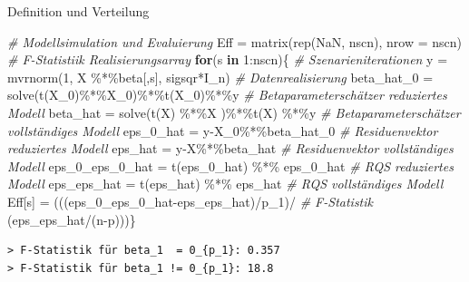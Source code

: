 \documentclass[
  8pt,
  ignorenonframetext,
]{beamer}
\newenvironment{Shaded}{\begin{snugshade}}{\end{snugshade}}
\newcommand{\AttributeTok}[1]{\textcolor[rgb]{0.77,0.63,0.00}{#1}}
\newcommand{\CommentTok}[1]{\textcolor[rgb]{0.56,0.35,0.01}{\textit{#1}}}
\newcommand{\ConstantTok}[1]{\textcolor[rgb]{0.00,0.00,0.00}{#1}}
\newcommand{\ControlFlowTok}[1]{\textcolor[rgb]{0.13,0.29,0.53}{\textbf{#1}}}
\newcommand{\DecValTok}[1]{\textcolor[rgb]{0.00,0.00,0.81}{#1}}
\newcommand{\FunctionTok}[1]{\textcolor[rgb]{0.00,0.00,0.00}{#1}}
\newcommand{\NormalTok}[1]{#1}
\newcommand{\OtherTok}[1]{\textcolor[rgb]{0.56,0.35,0.01}{#1}}
\newcommand{\SpecialCharTok}[1]{\textcolor[rgb]{0.00,0.00,0.00}{#1}}
\begin{document}
\begin{frame}[fragile]{Definition und Verteilung}
\begin{Shaded}
\begin{Highlighting}[]
\CommentTok{\# Modellsimulation und Evaluierung}
\NormalTok{Eff    }\OtherTok{=} \FunctionTok{matrix}\NormalTok{(}\FunctionTok{rep}\NormalTok{(}\ConstantTok{NaN}\NormalTok{, nscn), }\AttributeTok{nrow =}\NormalTok{ nscn)              }\CommentTok{\# F{-}Statistiik Realisierungsarray}
\ControlFlowTok{for}\NormalTok{(s }\ControlFlowTok{in} \DecValTok{1}\SpecialCharTok{:}\NormalTok{nscn)\{                                         }\CommentTok{\# Szenarieniterationen}
\NormalTok{  y               }\OtherTok{=} \FunctionTok{mvrnorm}\NormalTok{(}\DecValTok{1}\NormalTok{, X }\SpecialCharTok{\%*\%}\NormalTok{beta[,s], sigsqr}\SpecialCharTok{*}\NormalTok{I\_n) }\CommentTok{\# Datenrealisierung}
\NormalTok{  beta\_hat\_0      }\OtherTok{=} \FunctionTok{solve}\NormalTok{(}\FunctionTok{t}\NormalTok{(X\_0)}\SpecialCharTok{\%*\%}\NormalTok{X\_0)}\SpecialCharTok{\%*\%}\FunctionTok{t}\NormalTok{(X\_0)}\SpecialCharTok{\%*\%}\NormalTok{y      }\CommentTok{\# Betaparameterschätzer reduziertes Modell}
\NormalTok{  beta\_hat        }\OtherTok{=} \FunctionTok{solve}\NormalTok{(}\FunctionTok{t}\NormalTok{(X)  }\SpecialCharTok{\%*\%}\NormalTok{X  )}\SpecialCharTok{\%*\%}\FunctionTok{t}\NormalTok{(X)  }\SpecialCharTok{\%*\%}\NormalTok{y      }\CommentTok{\# Betaparameterschätzer vollständiges Modell}
\NormalTok{  eps\_0\_hat       }\OtherTok{=}\NormalTok{ y}\SpecialCharTok{{-}}\NormalTok{X\_0}\SpecialCharTok{\%*\%}\NormalTok{beta\_hat\_0                    }\CommentTok{\# Residuenvektor reduziertes Modell}
\NormalTok{  eps\_hat         }\OtherTok{=}\NormalTok{ y}\SpecialCharTok{{-}}\NormalTok{X}\SpecialCharTok{\%*\%}\NormalTok{beta\_hat                        }\CommentTok{\# Residuenvektor vollständiges Modell}
\NormalTok{  eps\_0\_eps\_0\_hat }\OtherTok{=} \FunctionTok{t}\NormalTok{(eps\_0\_hat) }\SpecialCharTok{\%*\%}\NormalTok{ eps\_0\_hat            }\CommentTok{\# RQS reduziertes Modell}
\NormalTok{  eps\_eps\_hat     }\OtherTok{=} \FunctionTok{t}\NormalTok{(eps\_hat)   }\SpecialCharTok{\%*\%}\NormalTok{ eps\_hat              }\CommentTok{\# RQS vollständiges Modell}
\NormalTok{  Eff[s]          }\OtherTok{=}\NormalTok{ (((eps\_0\_eps\_0\_hat}\SpecialCharTok{{-}}\NormalTok{eps\_eps\_hat)}\SpecialCharTok{/}\NormalTok{p\_1)}\SpecialCharTok{/} \CommentTok{\# F{-}Statistik}
\NormalTok{                       (eps\_eps\_hat}\SpecialCharTok{/}\NormalTok{(n}\SpecialCharTok{{-}}\NormalTok{p)))\}}
\end{Highlighting}
\end{Shaded}

\begin{verbatim}
> F-Statistik für beta_1  = 0_{p_1}: 0.357 
> F-Statistik für beta_1 != 0_{p_1}: 18.8
\end{verbatim}
\end{frame}
\end{document}

